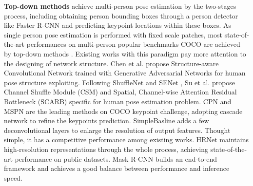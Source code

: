 \documentclass[10pt,journal,compsoc]{IEEEtran}
\begin{document}
\textbf{Top-down methods} achieve multi-person pose estimation by the two-stages process, including obtaining person bounding boxes through a person detector like Faster R-CNN \cite{ren2016faster} and predicting keypoint locations within these boxes. As single person pose estimation is performed with fixed scale patches, most state-of-the-art performances on multi-person popular benchmarks COCO \cite{COCO} are achieved by top-down methods \cite{CPN,MSPN,UDP}. Existing works with this paradigm pay more attention to the designing of network structure. Chen et al. \cite{SCN} propose Structure-aware Convolutional Network trained with Generative Adversarial Networks for human pose structure exploiting. Following ShuffleNet \cite{zhang2018shufflenet} and SENet \cite{hu2018squeeze}, Su et al. \cite{su2019multi} propose Channel Shuffle Module (CSM) and Spatial, Channel-wise Attention Residual Bottleneck (SCARB) specific for human pose estimation problem. CPN \cite{CPN} and MSPN \cite{MSPN} are the leading methods on COCO keypoint challenge, adopting cascade network to refine the keypoints prediction. SimpleBasline \cite{SBNet} adds a few deconvolutional layers to enlarge the resolution of output features. Thought simple, it has a competitive performance among existing works. HRNet \cite{HRNet} maintains high-resolution representations through the whole process, achieving state-of-the-art performance on public datasets. Mask R-CNN \cite{Mask-RCNN} builds an end-to-end framework and achieves a good balance between performance and inference speed.
\end{document}
